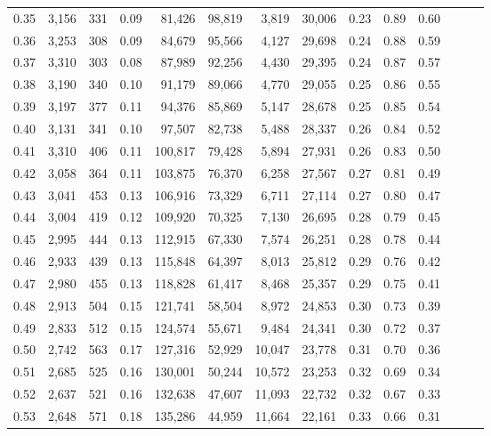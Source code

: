 \begin{tabular}{rrrrrrrrrrrrrr}
0.35 &  3,156 &  331 &  0.09 &   81,426 &   98,819 &   3,819 &  30,006 &  0.23 &  0.89 &      0.60 \\
0.36 &  3,253 &  308 &  0.09 &   84,679 &   95,566 &   4,127 &  29,698 &  0.24 &  0.88 &      0.59 \\
0.37 &  3,310 &  303 &  0.08 &   87,989 &   92,256 &   4,430 &  29,395 &  0.24 &  0.87 &      0.57 \\
0.38 &  3,190 &  340 &  0.10 &   91,179 &   89,066 &   4,770 &  29,055 &  0.25 &  0.86 &      0.55 \\
0.39 &  3,197 &  377 &  0.11 &   94,376 &   85,869 &   5,147 &  28,678 &  0.25 &  0.85 &      0.54 \\
0.40 &  3,131 &  341 &  0.10 &   97,507 &   82,738 &   5,488 &  28,337 &  0.26 &  0.84 &      0.52 \\
0.41 &  3,310 &  406 &  0.11 &  100,817 &   79,428 &   5,894 &  27,931 &  0.26 &  0.83 &      0.50 \\
0.42 &  3,058 &  364 &  0.11 &  103,875 &   76,370 &   6,258 &  27,567 &  0.27 &  0.81 &      0.49 \\
0.43 &  3,041 &  453 &  0.13 &  106,916 &   73,329 &   6,711 &  27,114 &  0.27 &  0.80 &      0.47 \\
0.44 &  3,004 &  419 &  0.12 &  109,920 &   70,325 &   7,130 &  26,695 &  0.28 &  0.79 &      0.45 \\
0.45 &  2,995 &  444 &  0.13 &  112,915 &   67,330 &   7,574 &  26,251 &  0.28 &  0.78 &      0.44 \\
0.46 &  2,933 &  439 &  0.13 &  115,848 &   64,397 &   8,013 &  25,812 &  0.29 &  0.76 &      0.42 \\
0.47 &  2,980 &  455 &  0.13 &  118,828 &   61,417 &   8,468 &  25,357 &  0.29 &  0.75 &      0.41 \\
0.48 &  2,913 &  504 &  0.15 &  121,741 &   58,504 &   8,972 &  24,853 &  0.30 &  0.73 &      0.39 \\
0.49 &  2,833 &  512 &  0.15 &  124,574 &   55,671 &   9,484 &  24,341 &  0.30 &  0.72 &      0.37 \\
0.50 &  2,742 &  563 &  0.17 &  127,316 &   52,929 &  10,047 &  23,778 &  0.31 &  0.70 &      0.36 \\
0.51 &  2,685 &  525 &  0.16 &  130,001 &   50,244 &  10,572 &  23,253 &  0.32 &  0.69 &      0.34 \\
0.52 &  2,637 &  521 &  0.16 &  132,638 &   47,607 &  11,093 &  22,732 &  0.32 &  0.67 &      0.33 \\
0.53 &  2,648 &  571 &  0.18 &  135,286 &   44,959 &  11,664 &  22,161 &  0.33 &  0.66 &      0.31 \\

\end{tabular}
